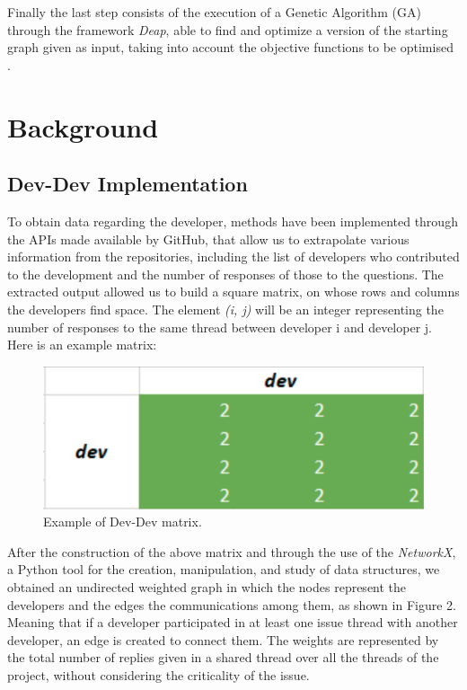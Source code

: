 \documentclass[sigconf]{acmart}
\begin{document}
Finally the last step consists of the execution of a Genetic Algorithm (GA) through the framework {\itshape Deap}, able to find and optimize a version of the starting graph given as input, taking into account the objective functions to be optimised \cite{palomba1}.

\section{Background}

\subsection{Dev-Dev Implementation}
To obtain data regarding the developer, methods have been implemented through the APIs made available by GitHub, that allow us to extrapolate various information from the repositories, including the list of developers who contributed to the development and the number of responses of those to the questions.
The extracted output allowed us to build a square matrix, on whose rows and columns the developers find space. The element {\itshape (i, j)} will be an integer representing the number of responses to the same thread between developer i and developer j. Here is an example matrix:

\begin{figure}[h]
  \centering
  \includegraphics[width=\linewidth]{img_4}
  \caption{Example of Dev-Dev matrix.}
  \Description{}
\end{figure}

After the construction of the above matrix and through the use of the {\itshape NetworkX}, a Python tool for the creation, manipulation, and study of data structures, we obtained an undirected weighted graph in which the nodes represent the developers and the edges the communications among them, as shown in Figure 2. Meaning that if a developer participated in at least one issue thread with another developer, an edge is created to connect them. The weights are represented by the total number of replies given in a shared thread over all the threads of the project, without considering the criticality of the issue.
\end{document}
